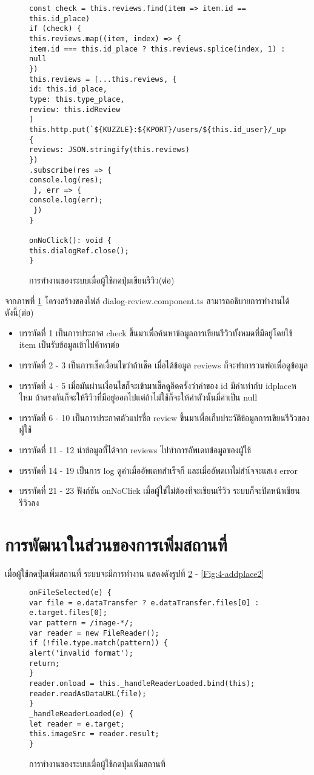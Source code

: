 \begin{figure}[H]
{\begin{lstlisting}
const check = this.reviews.find(item => item.id == this.id_place) 
if (check) {
this.reviews.map((item, index) => {
item.id === this.id_place ? this.reviews.splice(index, 1) : null 
})
this.reviews = [...this.reviews, {
id: this.id_place,
type: this.type_place,
review: this.idReview
]
this.http.put(`${KUZZLE}:${KPORT}/users/${this.id_user}/_update`, {
reviews: JSON.stringify(this.reviews)
})
.subscribe(res => {
console.log(res);
 }, err => {
console.log(err);
 })
}

onNoClick(): void {
this.dialogRef.close();
}
\end{lstlisting}}
\caption{การทำงานของระบบเมื่อผู้ใช้กดปุ่มเขียนรีวิว(ต่อ)}
\label{Fig:4-review2}
\end{figure}
\newpage

จากภาพที่ \ref{Fig:4-review2} โครงสร้างของไฟล์ dialog-review.component.ts สามารถอธิบายการทำงานได้ดังนี้(ต่อ)
\begin{itemize}[label={--}]
\item บรรทัดที่ 1 เป็นการประกาศ check ขึ้นมาเพื่อค้นหาข้อมูลการเขียนรีวิวทั้งหมดที่มีอยู่โดยใช้ item เป็นรับข้อมูลเข้าไปค้าหาต่อ
\item บรรทัดที่ 2 - 3 เป็นการเช็คเงื่อนไขว่าถ้าเช็ค เมื่อได้ข้อมูล reviews ก็จะทำการวนฟอเพื่อดูข้อมูล
\item บรรทัดที่ 4 - 5 เมื่อมันผ่านเงื่อนไขก็จะเข้ามาเช็คดูอีดครั้งว่าค่าของ id มีค่าเท่ากับ idplaceห ไหม ถ้าตรงกันก็จะให้รีวิวที่มีอยู่ออกไปแต่ถ้าไม่ใช้ก็จะให้ค่าตัวนั้นมี่ค่าเป็น null
\item บรรทัดที่ 6 - 10 เป็นการประกาศตัวแปรชื่อ review ขึ้นมาเพื่อเก็บประวัติข้อมูลการเขียนรีวิวของผูัใช้
\item บรรทัดที่ 11 - 12 นำข้อมูลที่ได้จาก reviews ไปทำการอัพเดทข้อมูลของผูัใช้
\item บรรทัดที่ 14 - 19 เป็นการ log ดูค่าเมื่ออัพเดทสำเร็จก็ และเมื่ออัพดเทไม่สำเ้จจะแสเง error
\item บรรทัดที่ 21 - 23 ฟังก์ชัน onNoClick เมื่อผู้ใช่ไม่ต้องทีจะเขียนเรีวิว ระบบก็จะปิดหน้าเขียนรีวิวลง
\end{itemize}
\newpage

\section{การพัฒนาในส่วนของการเพิ่มสถานที่}
เมื่อผู้ใช้กดปุ่มเพิ่มสถานที่ ระบบจะมีการทำงาน แสดงดังรูปที่ \ref{Fig:4-addplace} - \ref{Fig:4-addplace2}
\begin{figure}[H]
{\begin{lstlisting}
onFileSelected(e) {
var file = e.dataTransfer ? e.dataTransfer.files[0] : e.target.files[0];
var pattern = /image-*/;
var reader = new FileReader();
if (!file.type.match(pattern)) {
alert('invalid format');
return;
}
reader.onload = this._handleReaderLoaded.bind(this);
reader.readAsDataURL(file);
}
_handleReaderLoaded(e) {
let reader = e.target;
this.imageSrc = reader.result;
}
\end{lstlisting}}
\caption{การทำงานของระบบเมื่อผู้ใช้กดปุ่มเพิ่มสถานที่}
\label{Fig:4-addplace}
\end{figure}

